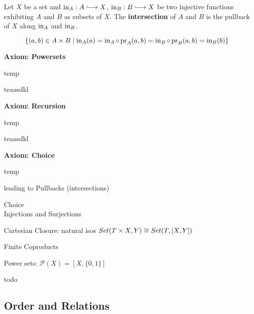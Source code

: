 	\begin{definition}
		Let $X$ be a set and $\incl_A:A \longrightincl X$, $\incl_B:B \longrightincl X$ be two injective functions exhibiting $A$ and $B$ as subsets of $X$. The \textbf{intersection} of $A$ and $B$ is the pullback of $X$ along $\operatorname{in}_A$ and $\operatorname{in}_B$. 

		$$\{(a,b) \in A \times B \mid \operatorname{in}_A(a) = \operatorname{in}_A \circ \operatorname{pr}_A (a,b) = \operatorname{in}_B \circ \operatorname{pr}_B(a,b) = \operatorname{in}_B(b)\}$$
	\end{definition}

	\begin{mdframed}[skipabove=1em, skipbelow=1em]
		\textbf{Axiom: Powersets}

		temp
	\end{mdframed}

	teaasdkl

	\begin{mdframed}[skipabove=1em, skipbelow=1em]
		\textbf{Axiom: Recursion}

		temp
	\end{mdframed}

	teaasdkl

	\begin{mdframed}[skipabove=1em, skipbelow=1em]
		\textbf{Axiom: Choice}

		temp
	\end{mdframed}





	leading to Pullbacks (intersections)

	Choice\\
	Injections and Surjections

	Cartesian Closure: natural isos $Set(T\times X, Y) \cong Set(T,[X,Y])$

	Finite Coproducts

	Power sets: $\mathcal{P}(X) = [X,\{0,1\}]$

	todo



	\newpage
	\subsection{Order and Relations}
